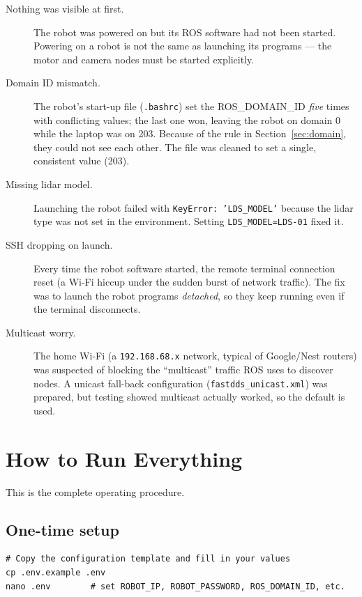 \documentclass[11pt,a4paper]{article}
\newcommand{\code}[1]{\texttt{#1}}
\begin{document}
\begin{description}
  \item[Nothing was visible at first.] The robot was powered on but its ROS
        software had not been started. Powering on a robot is not the same as
        launching its programs --- the motor and camera nodes must be started
        explicitly.
  \item[Domain ID mismatch.] The robot's start-up file (\code{.bashrc}) set the
        ROS\_DOMAIN\_ID \emph{five} times with conflicting values; the last one
        won, leaving the robot on domain 0 while the laptop was on 203. Because
        of the rule in Section~\ref{sec:domain}, they could not see each other.
        The file was cleaned to set a single, consistent value (203).
  \item[Missing lidar model.] Launching the robot failed with
        \code{KeyError: 'LDS\_MODEL'} because the lidar type was not set in the
        environment. Setting \code{LDS\_MODEL=LDS-01} fixed it.
  \item[SSH dropping on launch.] Every time the robot software started, the
        remote terminal connection reset (a Wi-Fi hiccup under the sudden burst
        of network traffic). The fix was to launch the robot programs
        \emph{detached}, so they keep running even if the terminal disconnects.
  \item[Multicast worry.] The home Wi-Fi (a \code{192.168.68.x} network, typical
        of Google/Nest routers) was suspected of blocking the ``multicast''
        traffic ROS uses to discover nodes. A unicast fall-back configuration
        (\code{fastdds\_unicast.xml}) was prepared, but testing showed multicast
        actually worked, so the default is used.
\end{description}

\section{How to Run Everything}
This is the complete operating procedure.

\subsection{One-time setup}
\begin{lstlisting}[style=bash]
# Copy the configuration template and fill in your values
cp .env.example .env
nano .env        # set ROBOT_IP, ROBOT_PASSWORD, ROS_DOMAIN_ID, etc.
\end{lstlisting}
\end{document}
